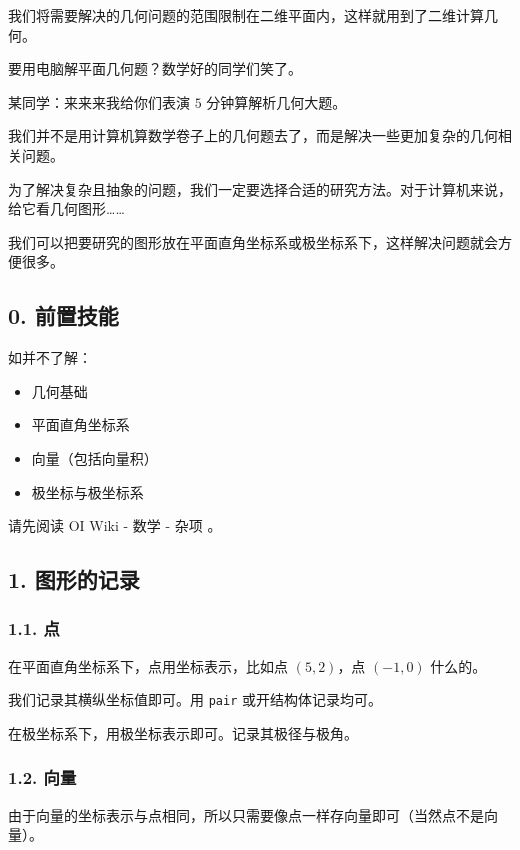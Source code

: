 
我们将需要解决的几何问题的范围限制在二维平面内，这样就用到了二维计算几何。

要用电脑解平面几何题？数学好的同学们笑了。

\begin{QUOTE}{}{}
某同学：来来来我给你们表演 $5$ 分钟算解析几何大题。
\end{QUOTE}

我们并不是用计算机算数学卷子上的几何题去了，而是解决一些更加复杂的几何相关问题。

为了解决复杂且抽象的问题，我们一定要选择合适的研究方法。对于计算机来说，给它看几何图形……

我们可以把要研究的图形放在平面直角坐标系或极坐标系下，这样解决问题就会方便很多。

\subsection{0. 前置技能}

如并不了解：

\begin{itemize}
\item 几何基础
\item 平面直角坐标系
\item 向量（包括向量积）
\item 极坐标与极坐标系
\end{itemize}

请先阅读  OI Wiki - 数学 - 杂项 。

\subsection{1. 图形的记录}

\subsubsection{1.1. 点}

在平面直角坐标系下，点用坐标表示，比如点 $(5,2)$，点 $(-1,0)$ 什么的。

我们记录其横纵坐标值即可。用 \texttt{pair} 或开结构体记录均可。

在极坐标系下，用极坐标表示即可。记录其极径与极角。

\subsubsection{1.2. 向量}

由于向量的坐标表示与点相同，所以只需要像点一样存向量即可（当然点不是向量）。

